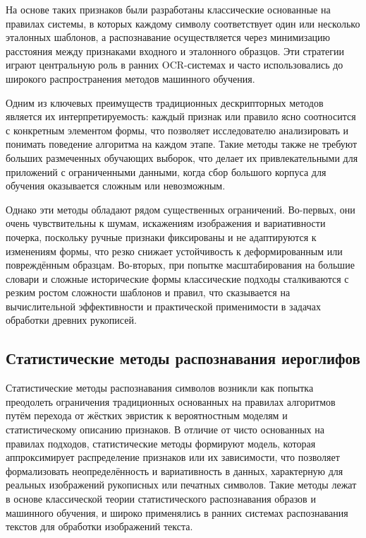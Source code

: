 На основе таких признаков были разработаны классические основанные на правилах системы, в которых каждому символу соответствует один или несколько эталонных шаблонов, а распознавание осуществляется через минимизацию расстояния между признаками входного и эталонного образцов. Эти стратегии играют центральную роль в ранних OCR-системах и часто использовались до широкого распространения методов машинного обучения.

Одним из ключевых преимуществ традиционных дескрипторных методов является их интерпретируемость: каждый признак или правило ясно соотносится с конкретным элементом формы, что позволяет исследователю анализировать и понимать поведение алгоритма на каждом этапе. Такие методы также не требуют больших размеченных обучающих выборок, что делает их привлекательными для приложений с ограниченными данными, когда сбор большого корпуса для обучения оказывается сложным или невозможным.

Однако эти методы обладают рядом существенных ограничений. Во-первых, они очень чувствительны к шумам, искажениям изображения и вариативности почерка, поскольку ручные признаки фиксированы и не адаптируются к изменениям формы, что резко снижает устойчивость к деформированным или повреждённым образцам. Во-вторых, при попытке масштабирования на большие словари и сложные исторические формы классические подходы сталкиваются с резким ростом сложности шаблонов и правил, что сказывается на вычислительной эффективности и практической применимости в задачах обработки древних рукописей.

\subsection{Статистические методы распознавания иероглифов}

Статистические методы распознавания символов возникли как попытка преодолеть ограничения традиционных основанных на правилах алгоритмов путём перехода от жёстких эвристик к вероятностным моделям и статистическому описанию признаков. В отличие от чисто основанных на правилах подходов, статистические методы формируют модель, которая аппроксимирует распределение признаков или их зависимости, что позволяет формализовать неопределённость и вариативность в данных, характерную для реальных изображений рукописных или печатных символов. Такие методы лежат в основе классической теории статистического распознавания образов и машинного обучения, и широко применялись в ранних системах распознавания текстов для обработки изображений текста.

